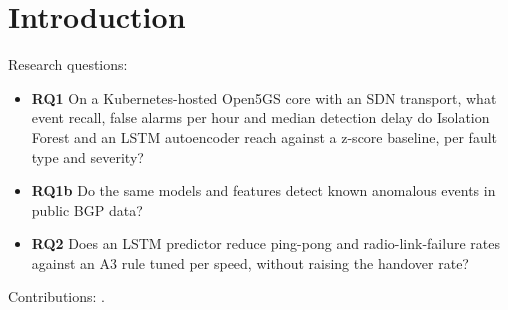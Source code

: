 \section{Introduction}
Research questions:
\begin{itemize}
\item \textbf{RQ1} On a Kubernetes-hosted Open5GS core with an SDN transport, what event recall,
false alarms per hour and median detection delay do Isolation Forest and an LSTM autoencoder reach
against a z-score baseline, per fault type and severity?
\item \textbf{RQ1b} Do the same models and features detect known anomalous events in public BGP data?
\item \textbf{RQ2} Does an LSTM predictor reduce ping-pong and radio-link-failure rates against an A3
rule tuned per speed, without raising the handover rate?
\end{itemize}
Contributions: .
